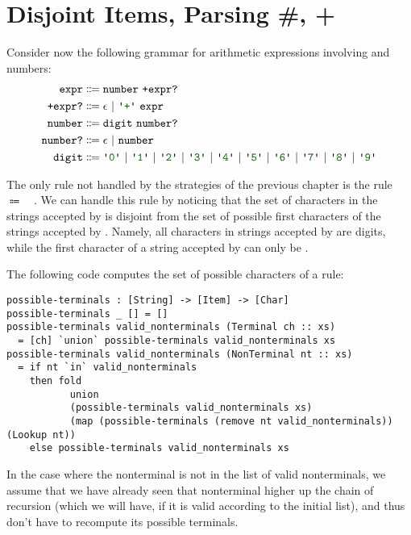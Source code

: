\chapter{Disjoint Items, Parsing \#, +} \label{ch:disjoint}

  Consider now the following grammar for arithmetic expressions involving \terminal{+} and numbers:
  \begin{align*}
    \nt{expr} & \Coloneqq \nt{number}~\nt{+expr?} \\
    \nt{+expr?} & \Coloneqq \nt{$\epsilon$}~|~\terminal{+}~\nt{expr} \\
    \nt{number} & \Coloneqq \nt{digit}~\nt{number?} \\
    \nt{number?} & \Coloneqq \epsilon~|~\nt{number} \\
    \nt{digit} & \Coloneqq \terminal{0}~|~\terminal{1}~|~\terminal{2}~|~\terminal{3}~|~\terminal{4}~|~\terminal{5}~|~\terminal{6}~|~\terminal{7}~|~\terminal{8}~|~\terminal{9}
  \end{align*}
  
  The only rule not handled by the strategies of the previous chapter is the rule ~$\Coloneqq$~~.  We can handle this rule by noticing that the set of characters in the strings accepted by  is disjoint from the set of possible first characters of the strings accepted by .  Namely, all characters in strings accepted by  are digits, while the first character of a string accepted by  can only be \terminal{+}.
  
  The following code computes the set of possible characters of a rule:
\begin{verbatim}
possible-terminals : [String] -> [Item] -> [Char]
possible-terminals _ [] = []
possible-terminals valid_nonterminals (Terminal ch :: xs)
  = [ch] `union` possible-terminals valid_nonterminals xs
possible-terminals valid_nonterminals (NonTerminal nt :: xs)
  = if nt `in` valid_nonterminals
    then fold
           union
           (possible-terminals valid_nonterminals xs)
           (map (possible-terminals (remove nt valid_nonterminals)) (Lookup nt))
    else possible-terminals valid_nonterminals xs
\end{verbatim}
    In the case where the nonterminal is not in the list of valid nonterminals, we assume that we have already seen that nonterminal higher up the chain of recursion (which we will have, if it is valid according to the initial list), and thus don't have to recompute its possible terminals.


